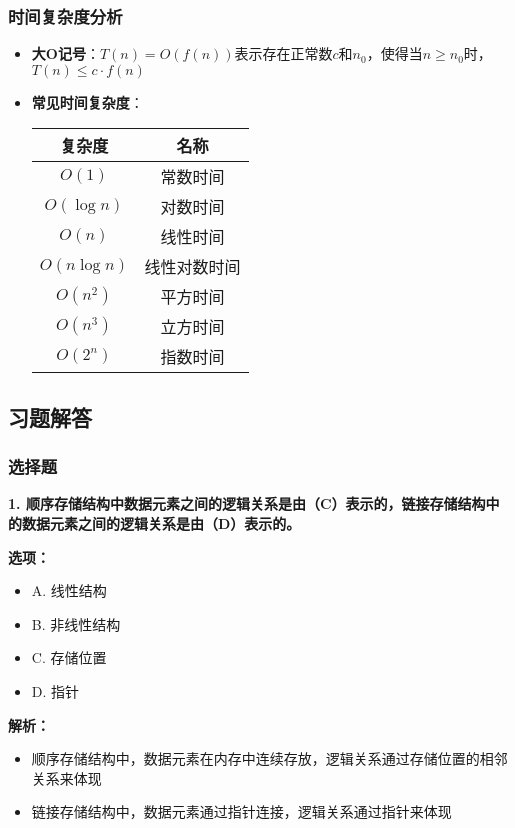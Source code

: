 \documentclass[12pt,a4paper]{amsart}
\begin{document}
\subsubsection{时间复杂度分析}
\begin{itemize}
\item \textbf{大O记号}：$T(n) = O(f(n))$表示存在正常数$c$和$n_0$，使得当$n \geq n_0$时，$T(n) \leq c \cdot f(n)$
\item \textbf{常见时间复杂度}：
\begin{center}
\begin{tabular}{|c|c|}
\hline
复杂度 & 名称 \\
\hline
$O(1)$ & 常数时间 \\
$O(\log n)$ & 对数时间 \\
$O(n)$ & 线性时间 \\
$O(n \log n)$ & 线性对数时间 \\
$O(n^2)$ & 平方时间 \\
$O(n^3)$ & 立方时间 \\
$O(2^n)$ & 指数时间 \\
\hline
\end{tabular}
\end{center}
\end{itemize}

\subsection{习题解答}

\subsubsection{选择题}

\textbf{1. 顺序存储结构中数据元素之间的逻辑关系是由（C）表示的，链接存储结构中的数据元素之间的逻辑关系是由（D）表示的。}

\textbf{选项：}
\begin{itemize}
\item A. 线性结构
\item B. 非线性结构  
\item C. 存储位置
\item D. 指针
\end{itemize}

\textbf{解析：}
\begin{itemize}
\item 顺序存储结构中，数据元素在内存中连续存放，逻辑关系通过存储位置的相邻关系来体现
\item 链接存储结构中，数据元素通过指针连接，逻辑关系通过指针来体现
\end{itemize}
\end{document}

